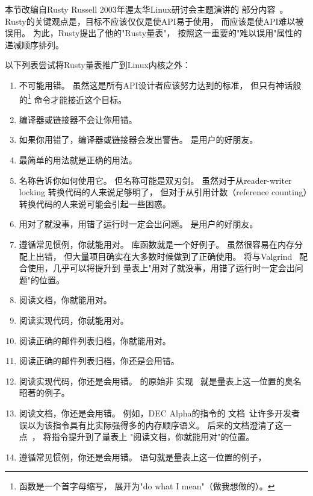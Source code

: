 本节改编自Rusty Russell 2003年渥太华Linux研讨会主题演讲的
部分内容~\cite[Slides~39--57]{RustyRussell2003OLSkeynote}。
Rusty的关键观点是，目标不应该仅仅是使API易于使用，
而应该是使API难以被误用。
为此，Rusty提出了他的"Rusty量表"，
按照这一重要的"难以误用"属性的递减顺序排列。

以下列表尝试将Rusty量表推广到Linux内核之外：

\begin{enumerate}
\item	不可能用错。
	虽然这是所有API设计者应该努力达到的标准，
	但只有神话般的\footnote{
		函数是一个首字母缩写，
		展开为"do what I mean"（做我想做的）。}
	命令才能接近这个目标。
\item	编译器或链接器不会让你用错。
\item	如果你用错了，编译器或链接器会发出警告。
	是用户的好朋友。
\item	最简单的用法就是正确的用法。
\item	名称告诉你如何使用它。
	但名称可能是双刃剑。
	虽然对于从reader-writer locking
	转换代码的人来说足够明了，
	但对于从引用计数（reference counting）转换代码的人来说可能会引起一些困惑。
\item	用对了就没事，用错了运行时一定会出问题。
	是用户的好朋友。
\item	遵循常见惯例，你就能用对。
	库函数就是一个好例子。
	虽然很容易在内存分配上出错，
	但大量项目确实在大多数时候做到了正确使用。
	将与Valgrind~\cite{ValgrindHomePage}
	配合使用，几乎可以将提升到
	量表上"用对了就没事，用错了运行时一定会出问题"的位置。
\item	阅读文档，你就能用对。
\item	阅读实现代码，你就能用对。
\item	阅读正确的邮件列表归档，你就能用对。
\item	阅读正确的邮件列表归档，你还是会用错。
\item	阅读实现代码，你还是会用错。
	的原始非
	实现~\cite{PaulEMcKenney2007PreemptibleRCU}
	就是量表上这一位置的臭名昭著的例子。
\item	阅读文档，你还是会用错。
	例如，DEC Alpha的指令的
	文档~\cite{ALPHA2002}让许多开发者
	误以为该指令具有比实际强得多的内存顺序语义。
	后来的文档澄清了这一点~\cite{Compaq01,WilliamPugh2000Gharachorloo}，
	将指令提升到了量表上
	"阅读文档，你就能用对"的位置。
\item	遵循常见惯例，你还是会用错。
	语句就是量表上这一位置的例子，

\end{enumerate}
